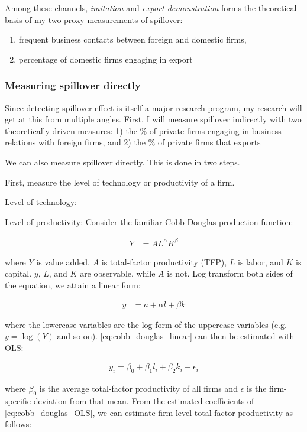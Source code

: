 Among these channels, \textit{imitation} and \textit{export demonstration} forms the theoretical basis of my two proxy measurements of spillover:
\begin{enumerate}
\item frequent business contacts between foreign and domestic firms,
\item percentage of domestic firms engaging in export
\end{enumerate}

\subsubsection{Measuring spillover directly}

Since detecting spillover effect is itself a major research program, my research will get at this from multiple angles. First, I will measure spillover indirectly with two theoretically driven measures: 1) the \% of private firms engaging in business relations with foreign firms, and 2) the \% of private firms that exports

We can also measure spillover directly. This is done in two steps.

First, measure the level of technology or productivity of a firm.

Level of technology: 

Level of productivity: Consider the familiar Cobb-Douglas production function:

\begin{align}
Y &= AL^{\alpha}K^{\beta}
\end{align}

where $Y$ is value added, $A$ is total-factor productivity (TFP), $L$ is labor, and $K$ is capital. $y$, $L$, and $K$ are observable, while $A$ is not. Log transform both sides of the equation, we attain a linear form:

\begin{align} \label{eq:cobb_douglas_linear}
y &= a + \alpha l + \beta k
\end{align}

where the lowercase variables are the log-form of the uppercase variables (e.g. $y = \log(Y)$ and so on). \autoref{eq:cobb_douglas_linear} can then be estimated with OLS:

\begin{align} \label{eq:cobb_douglas_OLS}
y_i = \beta_0 + \beta_1 l_i + \beta_2 k_i + \epsilon_i
\end{align} 

where $\beta_0$ is the average total-factor productivity of all firms and $\epsilon$ is the firm-specific deviation from that mean. From the estimated coefficients of \autoref{eq:cobb_douglas_OLS}, we can estimate firm-level total-factor productivity as follows:

